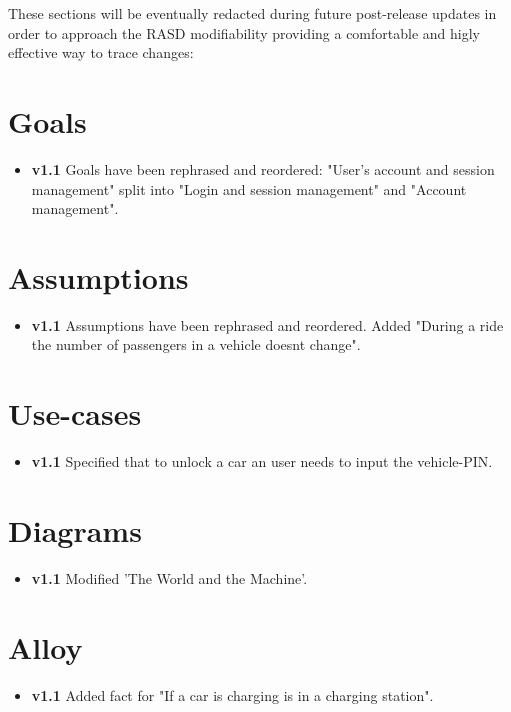 These sections will be eventually redacted during future post-release updates in order to approach the RASD modifiability providing a comfortable and higly effective way to trace changes:

\section{Goals}
	\begin{itemize}
		\item \textbf{v1.1} Goals have been rephrased and reordered: "User’s account and session management" split into "Login and session management" and "Account management".
	\end{itemize}
\section{Assumptions}
	\begin{itemize}
		\item \textbf{v1.1} Assumptions have been rephrased and reordered. Added "During a ride the number of passengers in a vehicle doesnt change".
	\end{itemize}
\section{Use-cases}
	\begin{itemize}
		\item \textbf{v1.1} Specified that to unlock a car an user needs to input the vehicle-PIN.
	\end{itemize}
\section{Diagrams}
	\begin{itemize}
		\item \textbf{v1.1} Modified 'The World and the Machine'.
	\end{itemize}
\section{Alloy}
	\begin{itemize}
		\item \textbf{v1.1} Added fact for "If a car is charging is in a charging station".
	\end{itemize}